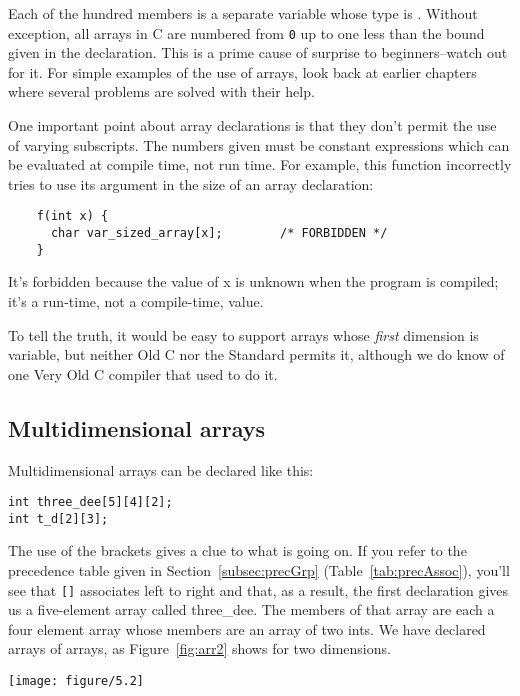   Each of the hundred members is a separate variable whose type is
   \double. Without exception, all arrays in C are numbered from
   \texttt{0} up to one less than the bound given in the declaration.
   This is a prime cause of surprise to beginners--watch out for it. For
   simple examples of the use of arrays, look back at earlier chapters where
   several problems are solved with their help.


  One important point about array declarations is that they don't permit
   the use of varying subscripts. The numbers given must be constant
   expressions which can be evaluated at compile time, not run time. For
   example, this function incorrectly tries to use its argument in the size
   of an array declaration:


  \begin{Verbatim}
    f(int x) {
      char var_sized_array[x];        /* FORBIDDEN */
    }
  \end{Verbatim}

  It's forbidden because the value of x is unknown when the program is
   compiled; it's a run-time, not a compile-time, value.


  To tell the truth, it would be easy to support arrays whose
   \textit{first} dimension is variable, but neither Old C nor the Standard
   permits it, although we do know of one Very Old C compiler that used to
   do it.


  \subsection{Multidimensional arrays}
   

   Multidimensional arrays can be declared like this:


\begin{Verbatim}
int three_dee[5][4][2];
int t_d[2][3];
\end{Verbatim}

   The use of the brackets gives a clue to what is going on. If you refer
   to the precedence table
   given in Section~\ref{subsec:precGrp} (Table~\ref{tab:precAssoc}),
   you'll see that \texttt{[]} associates left to
    right and that, as a result, the first declaration gives us
    a five-element array called three\_dee. The members of that array are
    each a four element array whose members are an array of two ints. We
    have declared arrays of arrays, as Figure~\ref{fig:arr2} shows for two
    dimensions.


    \begin{figure*}\centering
      \texttt{[image: figure/5.2]}
      \caption*{Diagram showing a two dimensional array, with the 'outer' array            having two elements labelled 't\_d[0]' and 't\_d[1]', each with            three elements within it, labelled 't\_d[0][0]', etc.}
     \caption{\label{fig:arr2}Two-dimensional array, showing layout}
   \end{figure*}




